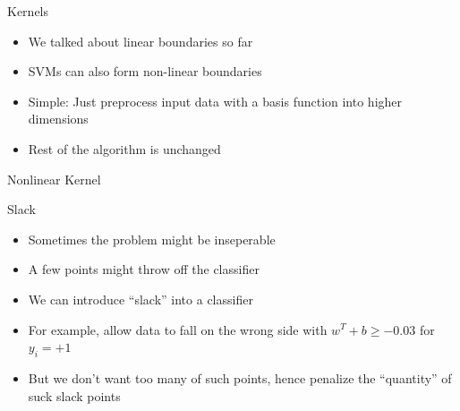 \documentclass[12pt,fleqn]{article}
\begin{document}
Kernels

\begin{itemize}
   \item We talked about linear boundaries so far
   \item SVMs can also form non-linear boundaries
   \item Simple: Just preprocess input data with a basis function into higher
   dimensions
   \item Rest of the algorithm is unchanged
\end{itemize}

Nonlinear Kernel


\begin{figure}[!hbp]
\caption{}
\end{figure}

Slack

\begin{itemize}
   \item Sometimes the problem might be inseperable
   \item A few points might throw off the classifier
   \item We can introduce ``slack'' into a classifier
   \item For example, allow data to fall on the wrong side with $w^{T}+b \geq
   -0.03$ for $y_{i}=+1$
   \item But we don't want too many of such points, hence penalize the
   ``quantity'' of suck slack points
\end{itemize}

\clearpage
\end{document}
